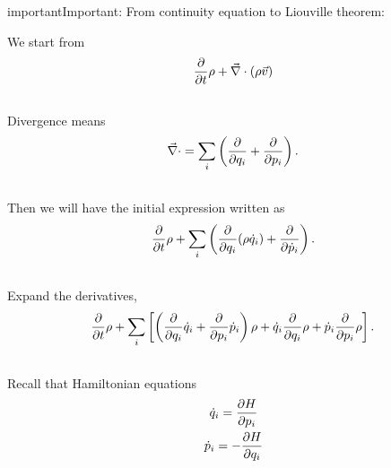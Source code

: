 \documentclass[letterpaper,10pt,english]{sphinxmanual}
\begin{document}
\begin{notice}{important}{Important:}
From continuity equation to Liouville theorem:

We start from
\begin{gather}
\begin{split}\frac{\partial}{\partial t} \rho + \vec \nabla \cdot (\rho \vec v)\end{split}\notag\\\begin{split}\end{split}\notag
\end{gather}
Divergence means
\begin{gather}
\begin{split}\vec \nabla \cdot  = \sum_i \left( \frac{\partial}{\partial q_i} + \frac{\partial}{\partial p_i} \right) .\end{split}\notag\\\begin{split}\end{split}\notag
\end{gather}
Then we will have the initial expression written as
\begin{gather}
\begin{split}\frac{\partial}{\partial t} \rho + \sum_i \left( \frac{\partial}{\partial q_i} (\rho \dot q_i) + \frac{\partial}{\partial \dot p_i} \right) .\end{split}\notag\\\begin{split}\end{split}\notag
\end{gather}
Expand the derivatives,
\begin{gather}
\begin{split}\frac{\partial}{\partial t} \rho + \sum_i \left[  \left( \frac{\partial}{\partial q_i} \dot q_i + \frac{\partial}{\partial p_i} \dot p_i\right) \rho +  \dot q_i \frac{\partial}{\partial q_i} \rho  + \dot p_i \frac{\partial}{\partial p_i} \rho  \right]   .\end{split}\notag\\\begin{split}\end{split}\notag
\end{gather}
Recall that Hamiltonian equations
\begin{gather}
\begin{split}\dot q_i  = \frac{\partial H}{\partial p_i}\end{split}\notag\\\begin{split}\dot p_i = - \frac{\partial H}{\partial q_i}\end{split}\notag

\end{gather}
\end{notice}
\end{document}
